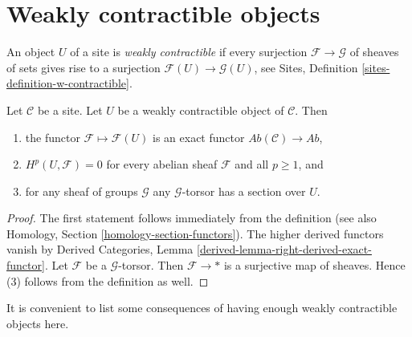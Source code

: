 \section{Weakly contractible objects}
\label{section-w-contractible}

\noindent
An object $U$ of a site is {\it weakly contractible} if every surjection
$\mathcal{F} \to \mathcal{G}$ of sheaves of sets gives rise to a surjection
$\mathcal{F}(U) \to \mathcal{G}(U)$, see
Sites, Definition \ref{sites-definition-w-contractible}.

\begin{lemma}
\label{lemma-w-contractible}
Let $\mathcal{C}$ be a site. Let $U$ be a weakly contractible
object of $\mathcal{C}$. Then
\begin{enumerate}
\item the functor $\mathcal{F} \mapsto \mathcal{F}(U)$ is an exact
functor $\textit{Ab}(\mathcal{C}) \to \textit{Ab}$,
\item $H^p(U, \mathcal{F}) = 0$
for every abelian sheaf $\mathcal{F}$ and all $p \geq 1$, and
\item for any sheaf of groups $\mathcal{G}$ any $\mathcal{G}$-torsor
has a section over $U$.
\end{enumerate}
\end{lemma}

\begin{proof}
The first statement follows immediately from the definition
(see also Homology, Section \ref{homology-section-functors}).
The higher derived functors vanish by
Derived Categories, Lemma \ref{derived-lemma-right-derived-exact-functor}.
Let $\mathcal{F}$ be a $\mathcal{G}$-torsor. Then $\mathcal{F} \to *$
is a surjective map of sheaves. Hence (3) follows from the
definition as well.
\end{proof}

\noindent
It is convenient to list some consequences of having enough
weakly contractible objects here.


